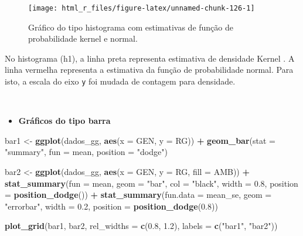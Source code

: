 \documentclass[
]{book}
\newenvironment{Shaded}{\begin{snugshade}}{\end{snugshade}}
\newcommand{\DataTypeTok}[1]{\textcolor[rgb]{0.13,0.29,0.53}{#1}}
\newcommand{\FloatTok}[1]{\textcolor[rgb]{0.00,0.00,0.81}{#1}}
\newcommand{\KeywordTok}[1]{\textcolor[rgb]{0.13,0.29,0.53}{\textbf{#1}}}
\newcommand{\NormalTok}[1]{#1}
\newcommand{\OperatorTok}[1]{\textcolor[rgb]{0.81,0.36,0.00}{\textbf{#1}}}
\newcommand{\StringTok}[1]{\textcolor[rgb]{0.31,0.60,0.02}{#1}}
\providecommand{\tightlist}{%
  \setlength{\itemsep}{0pt}\setlength{\parskip}{0pt}}
\begin{document}
\begin{figure}

{\centering \texttt{[image: html\_r\_files/figure-latex/unnamed-chunk-126-1]} 

}

\caption{Gráfico do tipo histograma com estimativas de função de probabilidade kernel e normal.}\label{fig:unnamed-chunk-126}
\end{figure}


No histograma (h1), a linha preta representa estimativa de densidade Kernel \citep{Silverman1998}. A linha vermelha representa a estimativa da função de probabilidade normal. Para isto, a escala do eixo \texttt{y} foi mudada de contagem para densidade.

\(~\)

\begin{itemize}
\tightlist
\item
  \textbf{Gráficos do tipo barra}
\end{itemize}

\begin{Shaded}
\begin{Highlighting}[]

\NormalTok{bar1 <-}\StringTok{ }\KeywordTok{ggplot}\NormalTok{(dados_gg, }\KeywordTok{aes}\NormalTok{(}\DataTypeTok{x =}\NormalTok{ GEN, }\DataTypeTok{y =}\NormalTok{ RG)) }\OperatorTok{+}
\StringTok{        }\KeywordTok{geom_bar}\NormalTok{(}\DataTypeTok{stat =} \StringTok{"summary"}\NormalTok{,}
                \DataTypeTok{fun =}\NormalTok{ mean,}
                \DataTypeTok{position =} \StringTok{"dodge"}\NormalTok{)}

\NormalTok{bar2 <-}\StringTok{ }\KeywordTok{ggplot}\NormalTok{(dados_gg, }\KeywordTok{aes}\NormalTok{(}\DataTypeTok{x =}\NormalTok{ GEN, }\DataTypeTok{y =}\NormalTok{ RG, }\DataTypeTok{fill =}\NormalTok{ AMB)) }\OperatorTok{+}
\StringTok{        }\KeywordTok{stat_summary}\NormalTok{(}\DataTypeTok{fun =}\NormalTok{ mean,}
                     \DataTypeTok{geom =} \StringTok{"bar"}\NormalTok{,}
                     \DataTypeTok{col =} \StringTok{"black"}\NormalTok{,}
                     \DataTypeTok{width =} \FloatTok{0.8}\NormalTok{,}
                     \DataTypeTok{position =} \KeywordTok{position_dodge}\NormalTok{()) }\OperatorTok{+}\StringTok{ }
\StringTok{        }\KeywordTok{stat_summary}\NormalTok{(}\DataTypeTok{fun.data =}\NormalTok{ mean_se,}
                     \DataTypeTok{geom =} \StringTok{"errorbar"}\NormalTok{,}
                     \DataTypeTok{width =} \FloatTok{0.2}\NormalTok{,}
                     \DataTypeTok{position =} \KeywordTok{position_dodge}\NormalTok{(}\FloatTok{0.8}\NormalTok{))}
 
\KeywordTok{plot_grid}\NormalTok{(bar1, bar2, }\DataTypeTok{rel_widths =} \KeywordTok{c}\NormalTok{(}\FloatTok{0.8}\NormalTok{, }\FloatTok{1.2}\NormalTok{), }\DataTypeTok{labels =} \KeywordTok{c}\NormalTok{(}\StringTok{"bar1"}\NormalTok{, }\StringTok{"bar2"}\NormalTok{))}
\end{Highlighting}
\end{Shaded}
\end{document}
